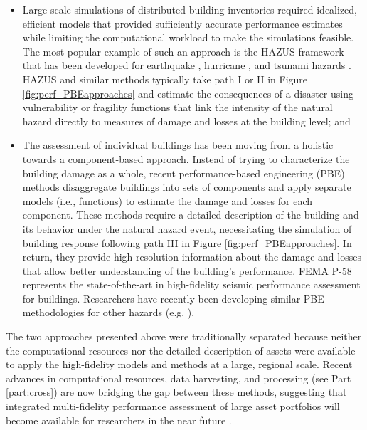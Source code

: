 \begin{itemize}
    \item Large-scale simulations of distributed building inventories required idealized, efficient models that provided sufficiently accurate performance estimates while limiting the computational workload to make the simulations feasible. The most popular example of such an approach is the HAZUS framework that has been developed for earthquake \citep{fema2018earthquaketechnical}, hurricane \citep{fema2018hurricaneuser}, and tsunami hazards \citep{fema2017tsunamitechnical}. HAZUS and similar methods typically take path I or II in Figure \ref{fig:perf_PBEapproaches} and estimate the consequences of a disaster using vulnerability or fragility functions that link the intensity of the natural hazard directly to measures of damage and losses at the building level; and

    \item The assessment of individual buildings has been moving from a holistic towards a component-based approach. Instead of trying to characterize the building damage as a whole, recent performance-based engineering (PBE) methods disaggregate buildings into sets of components and apply separate models (i.e., functions) to estimate the damage and losses for each component. These methods require a detailed description of the building and its behavior under the natural hazard event, necessitating the simulation of building response following path III in Figure \ref{fig:perf_PBEapproaches}. In return, they provide high-resolution information about the damage and losses that allow better understanding of the building's performance. FEMA P-58 \citep{atc2018p-58-1} represents the state-of-the-art in high-fidelity seismic performance assessment for buildings. Researchers have recently been developing similar PBE methodologies for other hazards (e.g. \cite{barbato2013performancebased, ouyang2020performance, attary2017performancebased}).
\end{itemize}

The two approaches presented above were traditionally separated because neither the computational resources nor the detailed description of assets were available to apply the high-fidelity models and methods at a large, regional scale. Recent advances in computational resources, data harvesting, and processing (see Part \ref{part:cross}) are now bridging the gap between these methods, suggesting that integrated multi-fidelity performance assessment of large asset portfolios will become available for researchers in the near future \citep{deierlein2020cloud}.

